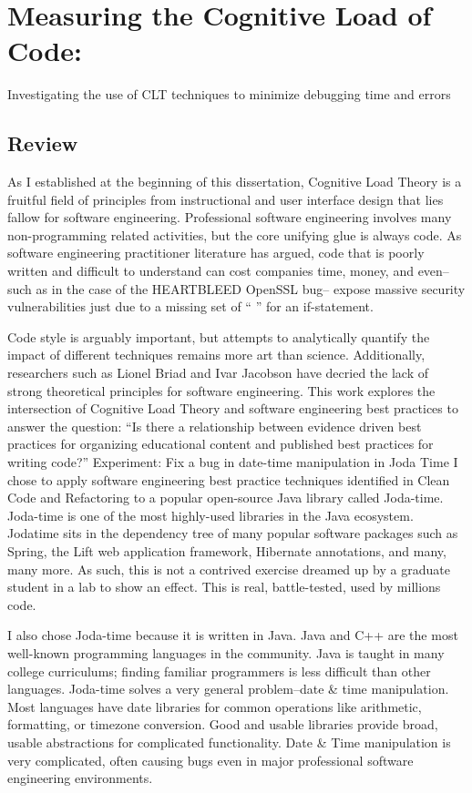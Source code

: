 \graphicspath{{./images/appendix3/}}
\chapter{Measuring the Cognitive Load of Code: }

Investigating the use of CLT techniques to minimize debugging time and errors

\section{Review}

As I established at the beginning of this dissertation, Cognitive Load Theory is a fruitful field of principles from instructional and user interface design that lies fallow for software engineering. Professional software engineering involves many non-programming related activities, but the core unifying glue is always code. As software engineering practitioner literature has argued, code that is poorly written and difficult to understand can cost companies time, money, and even--such as in the case of the HEARTBLEED OpenSSL bug-- expose massive security vulnerabilities just due to a missing set of “{ }” for an if-statement.

Code style is arguably important, but attempts to analytically quantify the impact of different techniques remains more art than science. Additionally, researchers such as Lionel Briad and Ivar Jacobson have decried the lack of strong theoretical principles for software engineering. This work explores the intersection of Cognitive Load Theory and software engineering best practices to answer the question: “Is there a relationship between evidence driven best practices for organizing educational content and published best practices for writing code?”
Experiment: Fix a bug in date-time manipulation in Joda Time
I chose to apply software engineering best practice techniques identified in Clean Code and Refactoring to a popular open-source Java library called Joda-time. Joda-time is one of the most highly-used libraries in the Java ecosystem. Jodatime sits in the dependency tree of many popular software packages such as Spring, the Lift web application framework, Hibernate annotations, and many, many more. As such, this is not a contrived exercise dreamed up by a graduate student in a lab to show an effect. This is real, battle-tested, used by millions code.
 
I also chose Joda-time because it is written in Java. Java and C++ are the most well-known programming languages in the community. Java is taught in many college curriculums; finding familiar programmers is less difficult than other languages. Joda-time solves a very general problem--date \& time manipulation. Most languages have date libraries for common operations like arithmetic, formatting, or timezone conversion. Good and usable libraries provide broad, usable abstractions for complicated functionality. Date \& Time manipulation is very complicated, often causing bugs even in major professional software engineering environments. 

